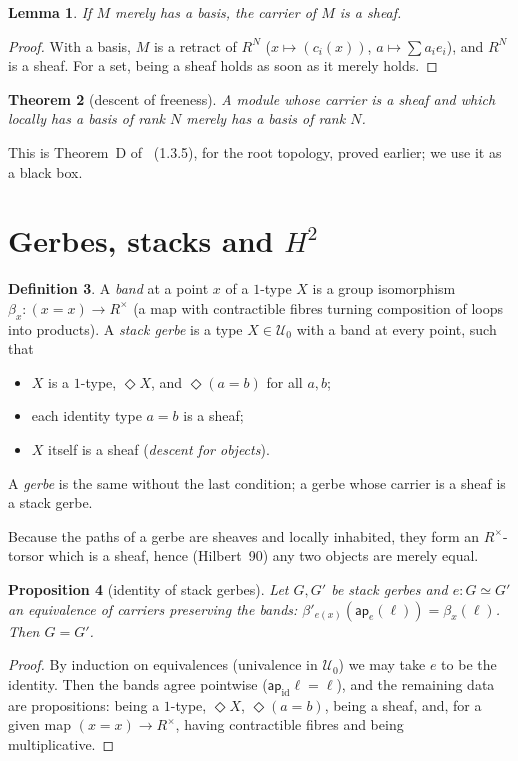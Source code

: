 \documentclass[11pt]{amsart}
\newtheorem{theorem}{Theorem}[section]
\newtheorem{lemma}[theorem]{Lemma}
\newtheorem{proposition}[theorem]{Proposition}
\theoremstyle{definition}
\newtheorem{definition}[theorem]{Definition}
\theoremstyle{remark}
\newcommand{\close}{\Diamond}
\newcommand{\Rx}{R^\times}
\newcommand{\U}{\mathcal U}
\newcommand{\ap}{\mathsf{ap}}
\begin{document}
\begin{lemma}\label{l:free-sheaf}
If $M$ merely has a basis, the carrier of $M$ is a sheaf.
\end{lemma}
\begin{proof}
With a basis, $M$ is a retract of $R^N$ ($x\mapsto(c_i(x))$,
$a\mapsto\sum a_ie_i$), and $R^N$ is a sheaf. For a set, being a sheaf
holds as soon as it merely holds.
\end{proof}

\begin{theorem}[descent of freeness]\label{t:D}
A module whose carrier is a sheaf and which locally has a basis of rank $N$
merely has a basis of rank $N$.
\end{theorem}

This is Theorem~D of~\cite{sevb} (1.3.5), for the root topology,
proved earlier; we use it as a black box.

\section{Gerbes, stacks and $H^2$}

\begin{definition}
A \emph{band} at a point $x$ of a $1$-type $X$ is a group isomorphism
$\beta_x:(x=x)\to\Rx$ (a map with contractible fibres turning composition
of loops into products). A \emph{stack gerbe} is a type $X\in\U_0$ with a
band at every point, such that
\begin{itemize}
\item $X$ is a $1$-type, $\close X$, and $\close(a=b)$ for all $a,b$;
\item each identity type $a=b$ is a sheaf;
\item $X$ itself is a sheaf (\emph{descent for objects}).
\end{itemize}
A \emph{gerbe} is the same without the last condition; a gerbe whose
carrier is a sheaf is a stack gerbe.
\end{definition}

Because the paths of a gerbe are sheaves and locally inhabited, they form
an $\Rx$-torsor which is a sheaf, hence (Hilbert~90) any two objects are
merely equal.

\begin{proposition}[identity of stack gerbes]\label{p:sip}
Let $G,G'$ be stack gerbes and $e:G\simeq G'$ an equivalence of carriers
preserving the bands: $\beta'_{e(x)}(\ap_e(\ell))=\beta_x(\ell)$. Then
$G=G'$.
\end{proposition}
\begin{proof}
By induction on equivalences (univalence in $\U_0$) we may take $e$ to be
the identity. Then the bands agree pointwise ($\ap_{\mathrm{id}}\ell=\ell$),
and the remaining data are propositions: being a $1$-type, $\close X$,
$\close(a=b)$, being a sheaf, and, for a given map
$(x=x)\to\Rx$, having contractible fibres and being multiplicative.
\end{proof}
\end{document}
